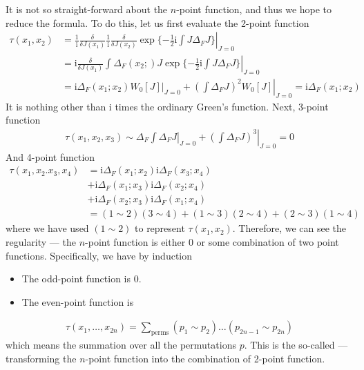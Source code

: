 \documentclass[letterpaper,10pt,english]{sphinxmanual}
\begin{document}
It is not so straight-forward about the \(n\)-point function, and thus we hope to reduce the formula. To do this, let us first evaluate the 2-point function
\begin{equation*}
\begin{split}\tau(x_1,x_2) &= \left.\frac{1}{\mathrm{i}}\!\frac{\delta}{\delta J(x_1)}\frac{1}{\mathrm{i}}\!\frac{\delta}{\delta J(x_2)}\exp\{-\frac{1}{2}\mathrm i\!\!\int\!\! J\Delta_FJ\}\right|_{J=0} \\
&= \left.\mathrm{i}\frac{\delta}{\delta J(x_1)}\int\!\!\Delta_F(x_2;)J\exp\{-\frac{1}{2}\mathrm i\!\!\int \!\!J\Delta_FJ\}\right|_{J=0}\\
&=\left.\mathrm i\Delta_F(x_1;x_2)W_0[J]\right|_{J=0} + \left.(\int\Delta_F J)^2W_0[J]\right|_{J=0} = \mathrm i\Delta_F(x_1;x_2)\end{split}
\end{equation*}
It is nothing other than \(\mathrm{i}\) times the ordinary Green's function. Next, 3-point function
\begin{equation*}
\begin{split}\tau(x_1,x_2,x_3)\sim \left.\Delta_F\int\Delta_FJ\right|_{J=0} + \left.(\int\Delta_FJ)^3\right|_{J=0} = 0\end{split}
\end{equation*}
And 4-point function
\begin{equation*}
\begin{split}\tau(x_1,x_2.x_3,x_4) &= \mathrm{i}\Delta_F(x_1;x_2)\mathrm{i}\Delta_F(x_3;x_4)\\
&+ \mathrm{i}\Delta_F(x_1;x_3)\mathrm{i}\Delta_F(x_2;x_4) \\
&+ \mathrm{i}\Delta_F(x_2;x_3)\mathrm{i}\Delta_F(x_1;x_4)\\
&= (1\sim2)(3\sim4) + (1\sim3)(2\sim4) + (2\sim3)(1\sim4)\end{split}
\end{equation*}
where we have used \((1\sim2)\) to represent \(\tau(x_1,x_2)\). Therefore, we can see the regularity --- the \(n\)-point function is either \(0\) or some combination of two point functions. Specifically, we have by induction
\begin{itemize}
\item {} 
The odd-point function is \(0\).

\item {} 
The even-point function is

\end{itemize}
\begin{equation*}
\begin{split}\tau(x_1,\ldots, x_{2n}) = \sum_{\text{perms}}(p_1\sim p_2)\ldots(p_{2n-1}\sim p_{2n})\end{split}
\end{equation*}
which means the summation over all the permutations \(p\). This is the so-called  --- transforming the \(n\)-point function into the combination of 2-point function.
\end{document}
